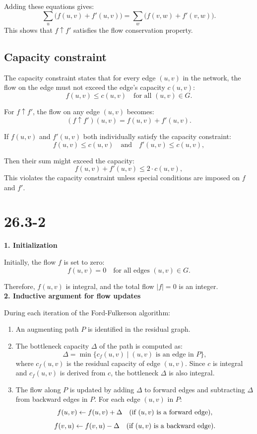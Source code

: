 \documentclass[12pt]{article}
\begin{document}
Adding these equations gives:
\[
\sum_{u} \big(f(u, v) + f'(u, v)\big) = \sum_{w} \big(f(v, w) + f'(v, w)\big).
\]
This shows that $f \uparrow f'$ satisfies the flow conservation property.

\subsection{Capacity constraint}
The capacity constraint states that for every edge $(u, v)$ in the network, the flow on the edge must not exceed the edge's capacity $c(u, v)$:
\[
f(u, v) \leq c(u, v) \quad \text{for all } (u, v) \in G.
\]

For $f \uparrow f'$, the flow on any edge $(u, v)$ becomes:
\[
(f \uparrow f')(u, v) = f(u, v) + f'(u, v).
\]

If $f(u, v)$ and $f'(u, v)$ both individually satisfy the capacity constraint:
\[
f(u, v) \leq c(u, v) \quad \text{and} \quad f'(u, v) \leq c(u, v),
\]

Then their sum might exceed the capacity:
\[
f(u, v) + f'(u, v) \leq 2 \cdot c(u, v),
\]
This violates the capacity constraint unless special conditions are imposed on $f$ and $f'$.
\section{26.3-2}
\textbf{1. Initialization}  

Initially, the flow \( f \) is set to zero:
\[
f(u, v) = 0 \quad \text{for all edges } (u, v) \in G.
\]

Therefore, \( f(u, v) \) is integral, and the total flow \( |f| = 0 \) is an integer.\\
\textbf{2. Inductive argument for flow updates}  

During each iteration of the Ford-Fulkerson algorithm:
\begin{enumerate}
    \item An augmenting path \( P \) is identified in the residual graph.
    \item The bottleneck capacity \( \Delta \) of the path is computed as:
    \[
    \Delta = \min \{ c_f(u, v) \mid (u, v) \text{ is an edge in } P \},
    \]
    where \( c_f(u, v) \) is the residual capacity of edge \( (u, v) \).  
    Since \( c \) is integral and \( c_f(u, v) \) is derived from \( c \), the bottleneck \( \Delta \) is also integral.
    \item The flow along \( P \) is updated by adding \( \Delta \) to forward edges and subtracting \( \Delta \) from backward edges in \( P \). For each edge \( (u, v) \) in \( P \):
    \[
    f(u, v) \gets f(u, v) + \Delta \quad \text{(if \( (u, v) \) is a forward edge)},
    \]
    \[
    f(v, u) \gets f(v, u) - \Delta \quad \text{(if \( (u, v) \) is a backward edge)}.
    \]
\end{enumerate}
\end{document}
